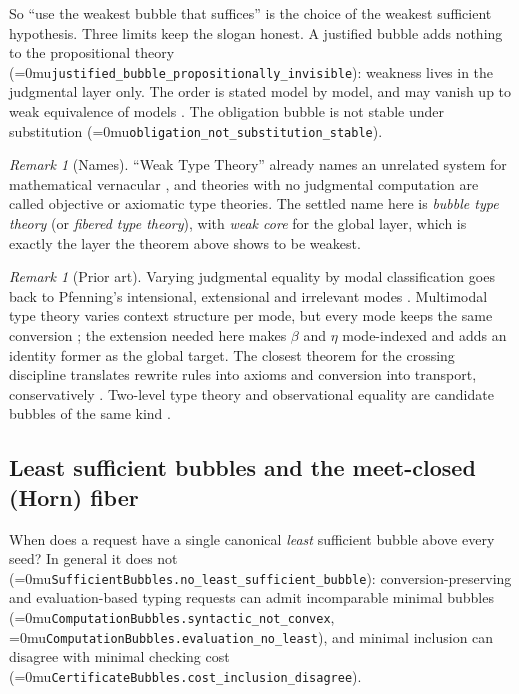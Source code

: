 \documentclass[11pt]{article}
\newcommand{\leanname}[1]{\textup{\Urlmuskip=0mu\relax\nolinkurl{#1}}}
\theoremstyle{definition}
\theoremstyle{remark}
\newtheorem{remark}[theorem]{Remark}
\begin{document}
So ``use the weakest bubble that suffices'' is the choice of the weakest
sufficient hypothesis. Three limits keep the slogan honest. A justified
bubble adds nothing to the propositional theory
(\leanname{justified_bubble_propositionally_invisible}): weakness lives in
the judgmental layer only. The order is stated model by model, and may vanish
up to weak equivalence of models \cite{BocquetCoherence,OttenSpadettoPathCategories}.
The obligation bubble is not stable under substitution
(\leanname{obligation_not_substitution_stable}).

\begin{remark}[Names]
``Weak Type Theory'' already names an unrelated system for mathematical
vernacular \cite{KamareddineNederpeltWTT}, and theories with no judgmental
computation are called objective or axiomatic type theories. The settled name
here is \emph{bubble type theory} (or \emph{fibered type theory}), with
\emph{weak core} for the global layer, which is exactly the layer the theorem
above shows to be weakest.
\end{remark}

\begin{remark}[Prior art]
Varying judgmental equality by modal classification goes back to Pfenning's
intensional, extensional and irrelevant modes \cite{PfenningIntensionalityLICS}.
Multimodal type theory varies context structure per mode, but every mode keeps
the same conversion \cite{GratzerKavvosNuytsBirkedalMTT}; the extension needed
here makes $\beta$ and $\eta$ mode-indexed and adds an identity former as the
global target. The closest theorem for the crossing discipline translates
rewrite rules into axioms and conversion into transport, conservatively
\cite{BlotDowekTraversieWinterhalter}. Two-level type theory and observational
equality are candidate bubbles of the same kind
\cite{AltenkirchCapriottiKraus2LTT,AltenkirchMcBrideOTT}.
\end{remark}

\subsection{Least sufficient bubbles and the meet-closed (Horn) fiber}

When does a request have a single canonical \emph{least} sufficient bubble above
every seed? In general it does not
(\leanname{SufficientBubbles.no_least_sufficient_bubble}): conversion-preserving
and evaluation-based typing requests can admit incomparable minimal bubbles
(\leanname{ComputationBubbles.syntactic_not_convex},
\leanname{ComputationBubbles.evaluation_no_least}), and minimal inclusion can
disagree with minimal checking cost
(\leanname{CertificateBubbles.cost_inclusion_disagree}).
\end{document}

